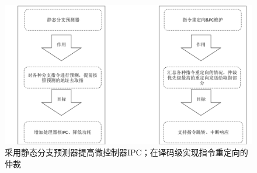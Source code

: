 \documentclass[a4paper, 12pt]{article}
\begin{document}
\begin{figure}[htbp]
  \centering
  \includegraphics[width=0.8\linewidth]{./images/id_design_features.pdf}
  \caption{采用静态分支预测器提高微控制器IPC；在译码级实现指令重定向的仲裁}
  \label{fig:id_design_features}
\end{figure}
\end{document}
